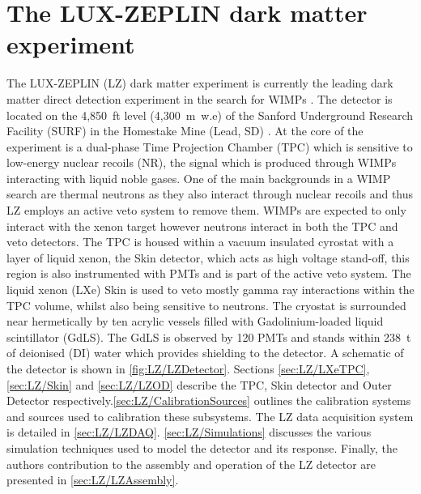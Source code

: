 \chapter{The LUX-ZEPLIN dark matter experiment}\label{chap:LZExperiment}
The LUX-ZEPLIN (LZ) dark matter experiment is currently the leading dark matter direct detection experiment in the search for WIMPs \cite{LZ:2024zvo}. The detector is located on the 4,850~ft level (4,300~m~w.e) of the Sanford Underground Research Facility (SURF) in the Homestake Mine (Lead, SD) \cite{LZNIMA}. At the core of the experiment is a dual-phase Time Projection Chamber (TPC) which is sensitive to low-energy nuclear recoils (NR), the signal which is produced through WIMPs interacting with liquid noble gases. One of the main backgrounds in a WIMP search are thermal neutrons as they also interact through nuclear recoils and thus LZ employs an active veto system to remove them. WIMPs are expected to only interact with the xenon target however neutrons interact in both the TPC and veto detectors.
The TPC is housed within a vacuum insulated cyrostat with a layer of liquid xenon, the Skin detector, which acts as high voltage stand-off, this region is also instrumented with PMTs and is part of the active veto system. The liquid xenon (LXe) Skin is used to veto mostly gamma ray interactions within the TPC volume, whilst also being sensitive to neutrons. The cryostat is surrounded near hermetically by ten acrylic vessels filled with Gadolinium-loaded liquid scintillator (GdLS). The GdLS is observed by 120 PMTs and stands within 238~t of deionised (DI) water which provides shielding to the detector. A schematic of the detector is shown in \autoref{fig:LZ/LZDetector}. 
Sections \ref{sec:LZ/LXeTPC}, \ref{sec:LZ/Skin} and \ref{sec:LZ/LZOD} describe the TPC, Skin detector and Outer Detector respectively.\autoref{sec:LZ/CalibrationSources} outlines the calibration systems and sources used to calibration these subsystems. The LZ data acquisition system is detailed in \autoref{sec:LZ/LZDAQ}. \autoref{sec:LZ/Simulations} discusses the various simulation techniques used to model the detector and its response. Finally, the authors contribution to the assembly and operation of the LZ detector are presented in \autoref{sec:LZ/LZAssembly}.

